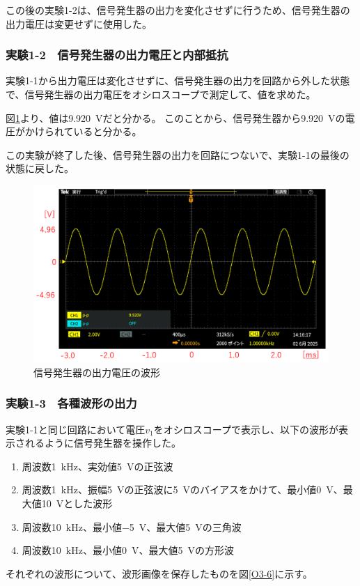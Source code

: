 \documentclass[uplatex, a4j, dvipdfmx]{jsarticle}
\begin{document}
この後の実験1-2は、信号発生器の出力を変化させずに行うため、信号発生器の出力電圧は変更せずに使用した。

\subsubsection*{実験1-2　信号発生器の出力電圧と内部抵抗}
実験1-1から出力電圧は変化させずに、信号発生器の出力を回路から外した状態で、信号発生器の出力電圧をオシロスコープで測定して、値を求めた。

図\ref{O2}より、値は\SI{9.920}{\volt}だと分かる。
このことから、信号発生器から\SI{9.920}{\volt}の電圧がかけられていると分かる。

この実験が終了した後、信号発生器の出力を回路につないで、実験1-1の最後の状態に戻した。

\begin{figure}[htbp]
    \centering
    \includegraphics[width=0.8\linewidth]{picture/O2.png}
    \caption{信号発生器の出力電圧の波形}
    \label{O2}
\end{figure}

\subsubsection*{実験1-3　各種波形の出力}
実験1-1と同じ回路において電圧$v_1$をオシロスコープで表示し、以下の波形が表示されるように信号発生器を操作した。
\begin{enumerate}[label=(\arabic*)]
    \item 周波数\SI{1}{\kilo\hertz}、実効値\SI{5}{\volt}の正弦波
    \item 周波数\SI{1}{\kilo\hertz}、振幅\SI{5}{\volt}の正弦波に\SI{5}{\volt}のバイアスをかけて、最小値\SI{0}{\volt}、最大値\SI{10}{\volt}とした波形
    \item 周波数\SI{10}{\kilo\hertz}、最小値\SI{-5}{\volt}、最大値\SI{5}{\volt}の三角波
    \item 周波数\SI{10}{\kilo\hertz}、最小値\SI{0}{\volt}、最大値\SI{5}{\volt}の方形波
\end{enumerate}
それぞれの波形について、波形画像を保存したものを図\ref{O3-6}に示す。
\end{document}
